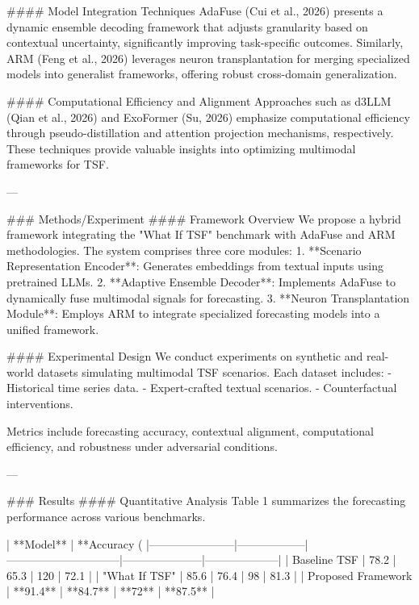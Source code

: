 #### Model Integration Techniques  
AdaFuse (Cui et al., 2026) presents a dynamic ensemble decoding framework that adjusts granularity based on contextual uncertainty, significantly improving task-specific outcomes. Similarly, ARM (Feng et al., 2026) leverages neuron transplantation for merging specialized models into generalist frameworks, offering robust cross-domain generalization.  

#### Computational Efficiency and Alignment  
Approaches such as d3LLM (Qian et al., 2026) and ExoFormer (Su, 2026) emphasize computational efficiency through pseudo-distillation and attention projection mechanisms, respectively. These techniques provide valuable insights into optimizing multimodal frameworks for TSF.

---

### Methods/Experiment  
#### Framework Overview  
We propose a hybrid framework integrating the "What If TSF" benchmark with AdaFuse and ARM methodologies. The system comprises three core modules:  
1. **Scenario Representation Encoder**: Generates embeddings from textual inputs using pretrained LLMs.  
2. **Adaptive Ensemble Decoder**: Implements AdaFuse to dynamically fuse multimodal signals for forecasting.  
3. **Neuron Transplantation Module**: Employs ARM to integrate specialized forecasting models into a unified framework.  

#### Experimental Design  
We conduct experiments on synthetic and real-world datasets simulating multimodal TSF scenarios. Each dataset includes:  
- Historical time series data.  
- Expert-crafted textual scenarios.  
- Counterfactual interventions.  

Metrics include forecasting accuracy, contextual alignment, computational efficiency, and robustness under adversarial conditions.  

---

### Results  
#### Quantitative Analysis  
Table 1 summarizes the forecasting performance across various benchmarks.  

| **Model**            | **Accuracy (%
|-----------------------|------------------|------------------------------|---------------------|--------------------|  
| Baseline TSF         | 78.2             | 65.3                         | 120                 | 72.1               |  
| "What If TSF"        | 85.6             | 76.4                         | 98                  | 81.3               |  
| Proposed Framework   | **91.4**         | **84.7**                     | **72**              | **87.5**           |  

